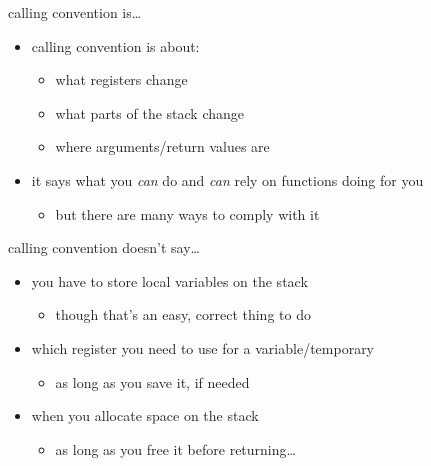 \begin{frame}{calling convention is\ldots}
\begin{itemize}
\item calling convention is about:
    \begin{itemize}
    \item what registers change
    \item what parts of the stack change
    \item where arguments/return values are
    \end{itemize}
\item it says what you \textit{can} do and \textit{can} rely on functions doing for you
    \begin{itemize}
    \item but there are many ways to comply with it
    \end{itemize}
\end{itemize}
\end{frame}

\begin{frame}{calling convention doesn't say\ldots}
\begin{itemize}
\item you have to store local variables on the stack
    \begin{itemize}
    \item though that's an easy, correct thing to do
    \end{itemize}
\item which register you need to use for a variable/temporary
    \begin{itemize}
    \item as long as you save it, if needed
    \end{itemize}
\item when you allocate space on the stack
    \begin{itemize}
    \item as long as you free it before returning\ldots
    \end{itemize}
\end{itemize}
\end{frame}
